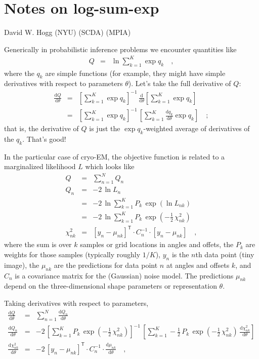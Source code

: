 \documentclass[12pt]{article}
\newcommand{\like}{L}
\newcommand{\dd}{\mathrm{d}}
\newcommand{\inverse}{^{-1}}
\newcommand{\transpose}{^{\mathsf{T}}}
\begin{document}
\section*{Notes on log-sum-exp}
\noindent
David W. Hogg (NYU) (SCDA) (MPIA)

\bigskip

Generically in probabilistic inference problems we encounter quantities like
\begin{eqnarray}
  Q
  &=& \ln\sum_{k=1}^K\exp q_k
  \quad,
\end{eqnarray}
where the $q_k$ are simple functions (for example, they might have simple
derivatives with respect to parameters $\theta$).
Let's take the full derivative of $Q$:
\begin{eqnarray}
  \frac{\dd Q}{\dd\theta}
  &=& \left[\sum_{k=1}^K\exp q_k\right]\inverse
      \,\frac{\dd}{\dd\theta}\left[\sum_{k=1}^K\exp q_k\right] \\
  &=& \left[\sum_{k=1}^K\exp q_k\right]\inverse
      \,\left[\sum_{k=1}^K\frac{\dd q_k}{\dd\theta}\exp q_k\right]
  \quad;
\end{eqnarray}
that is, the derivative of $Q$ is just the $\exp q_k$-weighted average
of derivatives of the $q_k$.
That's good!

In the particular case of cryo-EM, the objective function is related
to a marginalized likelihood $\like$ which looks like
\begin{eqnarray}
  Q
  &=&
  \sum_{n=1}^N Q_n \\
  Q_n
  &=& -2\,\ln\like_n \\
  &=& -2\,\ln\sum_{k=1}^K P_k\,\exp(\ln\like_{nk}) \\
  &=& -2\,\ln\sum_{k=1}^K P_k\,\exp(-\frac{1}{2}\,\chi^2_{nk}) \\
  \chi^2_{nk}
  &=& [y_n - \mu_{nk}]\transpose\cdot C_n\inverse\cdot [y_n - \mu_{nk}]
  \quad,
\end{eqnarray}
where the sum is over $k$ samples or grid locations in angles and
offets, the $P_k$ are weights for those samples (typically roughly
$1/K$), $y_n$ is the $n$th data point (tiny image), the $\mu_{nk}$ are
the predictions for data point $n$ at angles and offsets $k$, and
$C_n$ is a covariance matrix for the (Gaussian) noise model.
The predictions $\mu_{nk}$ depend on the three-dimensional shape
parameters or representation $\theta$.

Taking derivatives with respect to parameters,
\begin{eqnarray}
  \frac{\dd Q}{\dd\theta}
  &=&
  \sum_{n=1}^N \frac{\dd Q_n}{\dd\theta} \\
  \frac{\dd Q_n}{\dd\theta}
  &=& -2\,\left[\sum_{k=1}^K P_k\,\exp(-\frac{1}{2}\,\chi^2_{nk})\right]\inverse
        \,\left[\sum_{k=1}^K -\frac{1}{2}\,P_k\,\exp(-\frac{1}{2}\,\chi^2_{nk})\,\frac{\dd\chi^2_{nk}}{\dd\theta}\right] \\
  \frac{\dd\chi^2_{nk}}{\dd\theta}
  &=& -2\,[y_n - \mu_{nk}]\transpose\cdot C_n\inverse\cdot\frac{\dd\mu_{nk}}{\dd\theta}
  \quad,
\end{eqnarray}
\end{document}
